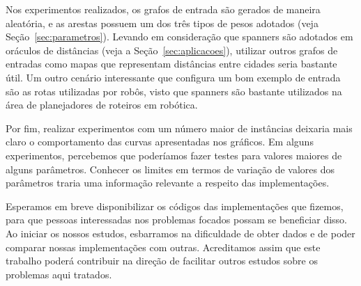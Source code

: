 
Nos experimentos realizados, os grafos de entrada são gerados de maneira
aleatória, e as arestas possuem um dos três tipos de pesos adotados
(veja Seção~\ref{sec:parametros}). Levando em consideração que spanners
são adotados em oráculos de distâncias (veja a Seção~\ref{sec:aplicacoes}),
utilizar outros grafos de entradas como mapas que representam distâncias
entre cidades seria bastante útil. Um outro cenário interessante que
configura um bom exemplo de entrada são as rotas utilizadas
por robôs, visto que spanners são bastante utilizados na área de
planejadores de roteiros em robótica.


Por fim, realizar experimentos com um número maior de instâncias
deixaria mais claro o comportamento das curvas apresentadas nos
gráficos. Em alguns experimentos, percebemos que poderíamos fazer
testes para valores maiores de alguns parâmetros. Conhecer os limites
em termos de variação de valores dos parâmetros traria uma informação
relevante a respeito das implementações.

Esperamos em breve disponibilizar os códigos das implementações que
fizemos, para que pessoas interessadas nos problemas focados possam se
beneficiar disso. Ao iniciar os nossos estudos, esbarramos na
dificuldade de obter dados e de poder comparar nossas implementações
com outras. Acreditamos assim que este trabalho poderá contribuir
na direção de facilitar outros estudos sobre os problemas aqui
tratados. 





